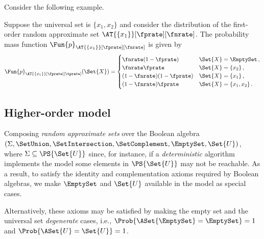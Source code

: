 \documentclass[ ../main.tex]{subfiles}
\begin{document}


Consider the following example.
\begin{example}
	Suppose the universal set is $\{ x_1,x_2 \}$ and consider the distribution of the first-order random approximate set $\AT{\{x_1\}}[\fprate][\fnrate]$.
	The probability mass function $\Fun{p}_{\AT{\{x_1\}}[\fprate][\fnrate]}$ is given by
	\begin{equation}
	\Fun{p}_{\AT{\{x_1\}}[\fprate][\tprate]}(\Set{X}) =
	\begin{cases} 
	\fnrate (1-\fprate) & \Set{X} = \EmptySet\,,\\
	\fnrate \fprate     & \Set{X} = \{x_2\}\,,\\
	(1-\fnrate)(1-\fprate)     & \Set{X} = \{x_1\}\,,\\
	(1-\fnrate)\fprate         & \Set{X} = \{x_1,x_2\}\,.
	\end{cases}
	\end{equation}
\end{example}


\subsection{Higher-order model}

Composing \emph{random approximate sets} over the Boolean algebra $(\Sigma,\SetUnion,\SetIntersection,\SetComplement,\EmptySet,\Set{U})$, where $\Sigma \subseteq \PS{\Set{U}}$ since, for instance, if a \emph{deterministic} algorithm implements the model some elements in $\PS{\Set{U}}$ may not be reachable.
As a result, to satisfy the identity and complementation axioms required by Boolean algebras, we make $\EmptySet$ and $\Set{U}$ available in the model as special cases.
\begin{remark}
	Alternatively, these axioms may be satisfied by making the empty set and the universal set \emph{degenerate} cases, i.e., $\Prob{\ASet{\EmptySet} = \EmptySet} = 1$ and $\Prob{\ASet{U} = \Set{U}} = 1$.
\end{remark}
\end{document}
